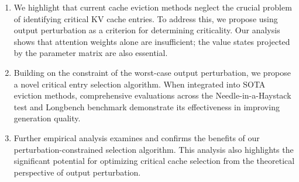 \begin{enumerate}
	\item We highlight that current cache eviction methods neglect the crucial problem of identifying critical KV cache entries. To address this, we propose using output perturbation as a criterion for determining criticality. Our analysis shows that attention weights alone are insufficient; the value states projected by the parameter matrix are also essential.
	\item  Building on the constraint of the worst-case output perturbation, we propose a novel critical entry selection algorithm. When integrated into SOTA eviction methods, comprehensive evaluations across the Needle-in-a-Haystack test and Longbench benchmark demonstrate its effectiveness in improving generation quality.
	\item  Further empirical analysis examines and confirms the benefits of our perturbation-constrained selection algorithm. This analysis also highlights the significant potential for optimizing critical cache selection from the theoretical perspective of output perturbation.
\end{enumerate}

